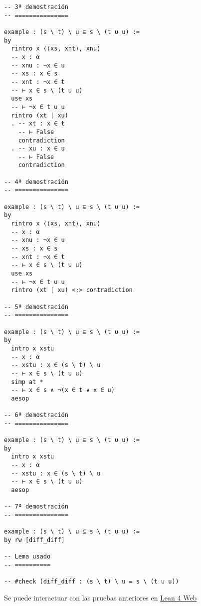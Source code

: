 \begin{verbatim}
-- 3ª demostración
-- ===============

example : (s \ t) \ u ⊆ s \ (t ∪ u) :=
by
  rintro x ⟨⟨xs, xnt⟩, xnu⟩
  -- x : α
  -- xnu : ¬x ∈ u
  -- xs : x ∈ s
  -- xnt : ¬x ∈ t
  -- ⊢ x ∈ s \ (t ∪ u)
  use xs
  -- ⊢ ¬x ∈ t ∪ u
  rintro (xt | xu)
  . -- xt : x ∈ t
    -- ⊢ False
    contradiction
  . -- xu : x ∈ u
    -- ⊢ False
    contradiction

-- 4ª demostración
-- ===============

example : (s \ t) \ u ⊆ s \ (t ∪ u) :=
by
  rintro x ⟨⟨xs, xnt⟩, xnu⟩
  -- x : α
  -- xnu : ¬x ∈ u
  -- xs : x ∈ s
  -- xnt : ¬x ∈ t
  -- ⊢ x ∈ s \ (t ∪ u)
  use xs
  -- ⊢ ¬x ∈ t ∪ u
  rintro (xt | xu) <;> contradiction

-- 5ª demostración
-- ===============

example : (s \ t) \ u ⊆ s \ (t ∪ u) :=
by
  intro x xstu
  -- x : α
  -- xstu : x ∈ (s \ t) \ u
  -- ⊢ x ∈ s \ (t ∪ u)
  simp at *
  -- ⊢ x ∈ s ∧ ¬(x ∈ t ∨ x ∈ u)
  aesop

-- 6ª demostración
-- ===============

example : (s \ t) \ u ⊆ s \ (t ∪ u) :=
by
  intro x xstu
  -- x : α
  -- xstu : x ∈ (s \ t) \ u
  -- ⊢ x ∈ s \ (t ∪ u)
  aesop

-- 7ª demostración
-- ===============

example : (s \ t) \ u ⊆ s \ (t ∪ u) :=
by rw [diff_diff]

-- Lema usado
-- ==========

-- #check (diff_diff : (s \ t) \ u = s \ (t ∪ u))
\end{verbatim}
Se puede interactuar con las pruebas anteriores en \href{https://lean.math.hhu.de/\#url=https://raw.githubusercontent.com/jaalonso/Calculemus2/main/src/Diferencia\_de\_diferencia\_de\_conjuntos.lean}{Lean 4 Web}

